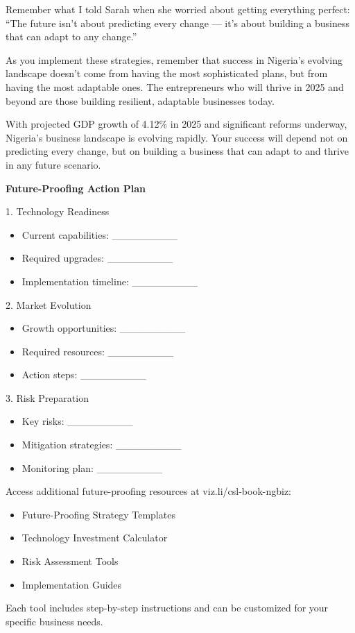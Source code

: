 Remember what I told Sarah when she worried about getting everything perfect: ``The future isn't about predicting every change --- it's about building a business that can adapt to any change.''

As you implement these strategies, remember that success in Nigeria's evolving landscape doesn't come from having the most sophisticated plans, but from having the most adaptable ones. The entrepreneurs who will thrive in 2025 and beyond are those building resilient, adaptable businesses today.

\begin{importantbox}
With projected GDP growth of 4.12\% in 2025 and significant reforms underway, Nigeria's business landscape is evolving rapidly. Your success will depend not on predicting every change, but on building a business that can adapt to and thrive in any future scenario.
\end{importantbox}

\begin{workshopbox}
\textbf{Future-Proofing Action Plan}

1. Technology Readiness
\begin{itemize}
    \item Current capabilities: \_\_\_\_\_\_\_\_\_
    \item Required upgrades: \_\_\_\_\_\_\_\_\_
    \item Implementation timeline: \_\_\_\_\_\_\_\_\_
\end{itemize}

2. Market Evolution
\begin{itemize}
    \item Growth opportunities: \_\_\_\_\_\_\_\_\_
    \item Required resources: \_\_\_\_\_\_\_\_\_
    \item Action steps: \_\_\_\_\_\_\_\_\_
\end{itemize}

3. Risk Preparation
\begin{itemize}
    \item Key risks: \_\_\_\_\_\_\_\_\_
    \item Mitigation strategies: \_\_\_\_\_\_\_\_\_
    \item Monitoring plan: \_\_\_\_\_\_\_\_\_
\end{itemize}
\end{workshopbox}

\begin{communitybox}
Access additional future-proofing resources at viz.li/csl-book-ngbiz:
\begin{itemize}
    \item Future-Proofing Strategy Templates
    \item Technology Investment Calculator
    \item Risk Assessment Tools
    \item Implementation Guides
\end{itemize}
Each tool includes step-by-step instructions and can be customized for your specific business needs.
\end{communitybox}

